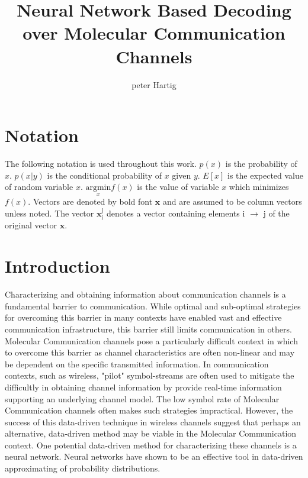 \documentclass[12pt,a4paper]{report}
\title{Neural Network Based Decoding over Molecular Communication Channels}
\author{peter Hartig}
\begin{document}
\maketitle

\begin{abstract}

\end{abstract}

\newpage
\tableofcontents
\newpage
\section{Notation}
The following notation is used throughout this work.
$p(x)$ is the probability of $x$.
$p(x|y)$ is the conditional probability of $x$ given $y$.
$E[x]$ is the expected value of random variable $x$.
$\underset{x}{\text{argmin}} f(x)$ is the value of variable $x$ which minimizes $f(x)$.
Vectors  are denoted by bold font $\mathbf{x}$ and are assumed to be column vectors unless noted.
The vector $\mathbf{x}_{\mathrm{i}}^{\mathrm{j}}$ denotes a vector containing elements i $\rightarrow$ j of the original vector $\mathbf{x}$.

\section{Introduction}
Characterizing and obtaining information about communication channels is a fundamental barrier to communication. While optimal and sub-optimal strategies for overcoming this barrier in many contexts have enabled vast and effective communication infrastructure, this barrier still limits communication in others. Molecular Communication channels pose a particularly difficult context in which to overcome this barrier as channel characteristics are often non-linear and may be dependent on the specific transmitted information.
In communication contexts, such as wireless, "pilot" symbol-streams are often used to mitigate the difficultly in obtaining channel information by provide real-time information supporting an underlying channel model. The low symbol rate of Molecular Communication channels often makes such strategies impractical. However, the success of this data-driven technique in wireless channels suggest that perhaps an alternative, data-driven method may be viable in the Molecular Communication context. One potential data-driven method for characterizing these channels is a neural network. Neural networks have shown to be an effective tool in data-driven approximating of probability distributions.
\par
\end{document}
